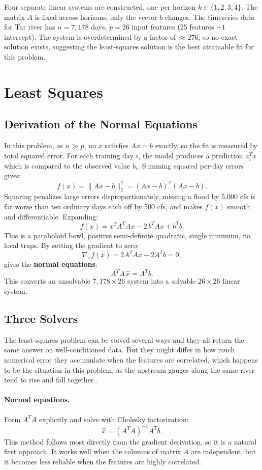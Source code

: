 \documentclass[10pt, twocolumn]{article}
\begin{document}
Four separate linear systems are constructed, one per horizon $k \in \{1,2,3,4\}$. The matrix $A$ is fixed across horizons; only the vector $b$ changes. The timeseries data for Tar river has $n = 7{,}178$ days, $p = 26$ input features (25 features $+1$ intercept).
The system is overdetermined by a factor of $\approx 276$, so no exact solution exists, suggesting the least-squares solution is the best attainable fit for this problem.

\section{Least Squares}

\subsection{Derivation of the Normal Equations}
In this problem, as $n \gg p$, no $x$ satisfies $Ax = b$ exactly, so the fit is measured by total squared error. For each training day $i$,
the model produces a prediction $a_i^T x$ which is compared to the observed value $b_i$.
Summing squared per-day errors gives:
\[
  f(x) = \|Ax - b\|_2^2 = (Ax - b)^T(Ax - b).
\]
Squaring penalizes large errors disproportionately, missing a flood by 5,000 cfs is far worse than ten ordinary days each off by 500 cfs, and makes $f(x)$ smooth and differentiable. Expanding:
\[
  f(x) = x^T A^T A x - 2\, b^T A x + b^T b.
\]
This is a paraboloid bowl, positive semi-definite quadratic, single minimum, no local traps. By setting the gradient to zero:
\[
  \nabla_x f(x) = 2 A^T A x - 2 A^T b = 0,
\]
gives the \textbf{normal equations}:
\[
  \boxed{A^T A\, \hat{x} = A^T b.}
\]
This converts an unsolvable $7{,}178 \times 26$ system into a solvable $26 \times 26$ linear system.

\subsection{Three Solvers}

The least-squares problem can be solved several ways and they all return the same answer on well-conditioned data. But they might differ in how much numerical error they accumulate when the features are correlated, which happens to be the situation in this problem, as the upstream gauges along the same river tend to rise and fall together \cite{trefethen1997, golub2013}.

\paragraph{Normal equations.}
Form $A^TA$ explicitly and solve with Cholesky factorization:
\[
  \hat{x} = (A^TA)^{-1} A^T b.
\]
This method follows most directly from the gradient derivation, so it is a natural first approach. It works well when the columns of matrix \(A\) are independent, but it becomes less reliable when the features are highly correlated.
\end{document}
